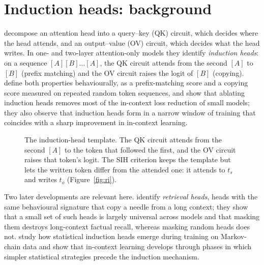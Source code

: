 \section{Induction heads: background}
\label{app:ih}

\citet{elhage2021mathematical} decompose an attention head into a query--key (QK)
circuit, which decides where the head attends, and an output--value (OV) circuit,
which decides what the head writes. In one- and two-layer attention-only models they
identify \emph{induction heads}: on a sequence $[A][B]\ldots[A]$, the QK circuit
attends from the second $[A]$ to $[B]$ (prefix matching) and the OV circuit raises the
logit of $[B]$ (copying). \citet{olsson2022induction} define both properties
behaviourally, as a prefix-matching score and a copying score measured on repeated
random token sequences, and show that ablating induction heads removes most of the
in-context loss reduction of small models; they also observe that induction heads form
in a narrow window of training that coincides with a sharp improvement in in-context
learning.

\begin{figure}[h]
\centering
{}
\caption{The induction-head template. The QK circuit attends from the second $[A]$
to the token that followed the first, and the OV circuit raises that token's logit.
The SIH criterion keeps the template but lets the written token differ from the
attended one: it attends to $t_s$ and writes $t_o$ (Figure~\ref{fig:ri}).}
\label{fig:ih}
\end{figure}

Two later developments are relevant here. \citet{wu2024retrieval} identify
\emph{retrieval heads}, heads with the same behavioural signature that copy a needle
from a long context; they show that a small set of such heads is largely universal
across models and that masking them destroys long-context factual recall, whereas
masking random heads does not. \citet{edelman2024evolution} study how statistical
induction heads emerge during training on Markov-chain data and show that in-context
learning develops through phases in which simpler statistical strategies precede the
induction mechanism.

